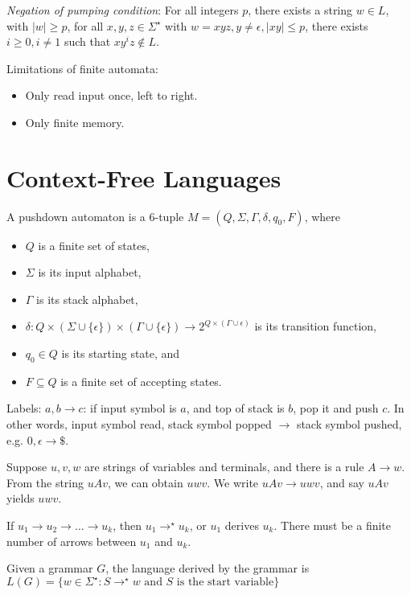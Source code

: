 \documentclass[letterpaper,landscape,11pt]{article}
\begin{document}
\emph{Negation of pumping condition}: For all integers $p$, there exists a string $w \in L$, with $|w| \geq p$, for all $x, y, z \in \Sigma^\star$ with $w = xyz, y \neq \epsilon, |xy| \leq p$, there exists $i \geq 0, i \neq 1$ such that $xy^iz \notin L$.

Limitations of finite automata:
\begin{itemize}
	\item Only read input once, left to right.
	\item Only finite memory.
\end{itemize}

\section{Context-Free Languages}
A pushdown automaton is a 6-tuple $M = (Q, \Sigma, \Gamma, \delta, q_0, F)$, where
\begin{itemize}
	\item $Q$ is a finite set of states,
	\item $\Sigma$ is its input alphabet,
	\item $\Gamma$ is its stack alphabet,
	\item $\delta : Q \times (\Sigma \cup \{\epsilon\}) \times (\Gamma \cup \{\epsilon\}) \rightarrow 2^{Q \times (\Gamma \cup \epsilon)}$ is its transition function,
	\item $q_0 \in  Q$ is its starting state, and
	\item $F \subseteq Q$ is a finite set of accepting states.
\end{itemize}

Labels: $a, b \rightarrow c$: if input symbol is $a$, and top of stack is $b$, pop it and push $c$. In other words, input symbol read, stack symbol popped $\rightarrow$ stack symbol pushed, e.g. $0, \epsilon \rightarrow \$$.

Suppose $u, v, w$ are strings of variables and terminals, and there is a rule $A \rightarrow w$. From the string $uAv$, we can obtain $uwv$. We write $uAv \rightarrow uwv$, and say $uAv$ yields $uwv$.

If $u_1 \rightarrow u_2 \rightarrow \dots \rightarrow u_k$, then $u_1 \rightarrow^\star u_k$, or $u_1$ derives $u_k$. There must be a finite number of arrows between $u_1$ and $u_k$.

Given a grammar $G$, the language derived by the grammar is $L(G) = \{w \in \Sigma^\star : S \rightarrow^\star w \text{ and } S \text{ is the start variable}\}$
\end{document}
